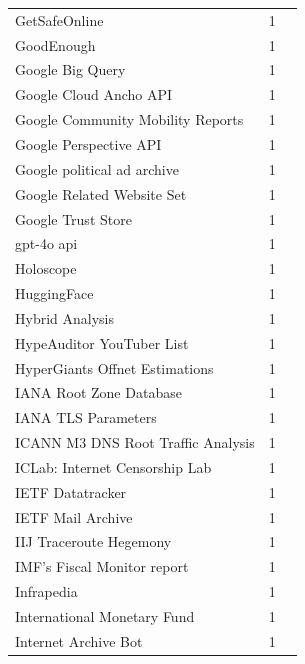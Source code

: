 \documentclass[11pt,a4paper]{article}
\begin{document}
\begin{longtable}{@{}p{} p{}p{}@{}}
GetSafeOnline & 1 & \cite{10.1145/3777912.3839788} \\
GoodEnough & 1 & \cite{10.1007/978-3-032-18268-5_13} \\
Google Big Query & 1 & \cite{10.1007/978-3-030-98785-5_30} \\
Google Cloud Ancho API & 1 & \cite{10.1007/978-3-030-98785-5_8} \\
Google Community Mobility Reports & 1 & \cite{10.1145/3487552.3487831} \\
Google Perspective API & 1 & \cite{10.1145/3618257.3624820} \\
Google political ad archive & 1 & \cite{10.1145/3487552.3487850} \\
Google Related Website Set & 1 & \cite{10.1145/3646547.3689026} \\
Google Trust Store & 1 & \cite{10.1007/978-3-031-28486-1_4} \\
gpt-4o api & 1 & \cite{10.1145/3777912.3809155} \\
Holoscope & 1 & \cite{10.1145/3777912.3839810} \\
HuggingFace & 1 & \cite{10.1145/3777912.3839799} \\
Hybrid Analysis & 1 & \cite{10.1145/3777912.3809151} \\
HypeAuditor YouTuber List & 1 & \cite{10.1145/3618257.3624822} \\
HyperGiants Offnet Estimations & 1 & \cite{10.1145/3777912.3839831} \\
IANA Root Zone Database & 1 & \cite{10.1145/3618257.3624836} \\
IANA TLS Parameters & 1 & \cite{10.1007/978-3-031-28486-1_6} \\
ICANN M3 DNS Root Traffic Analysis & 1 & \cite{10.1007/978-3-031-28486-1_21} \\
ICLab: Internet Censorship Lab  & 1 & \cite{10.1007/978-3-030-98785-5_23} \\
IETF Datatracker & 1 & \cite{10.1145/3487552.3487821} \\
IETF Mail Archive & 1 & \cite{10.1145/3487552.3487821} \\
IIJ Traceroute Hegemony & 1 & \cite{10.1145/3777912.3839831} \\
IMF’s Fiscal Monitor report & 1 & \cite{10.1145/3487552.3487822} \\
Infrapedia & 1 & \cite{10.1007/978-3-030-98785-5_29} \\
International Monetary Fund & 1 & \cite{10.1145/3487552.3487822} \\
Internet Archive Bot & 1 & \cite{10.1145/3517745.3561451} \\

\end{longtable}
\end{document}
